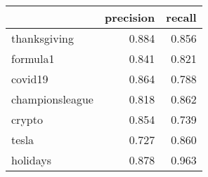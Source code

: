 \begin{tabular}{lrr}
\toprule
{} &  precision &  recall \\
\midrule
thanksgiving    &      0.884 &   0.856 \\
formula1        &      0.841 &   0.821 \\
covid19         &      0.864 &   0.788 \\
championsleague &      0.818 &   0.862 \\
crypto          &      0.854 &   0.739 \\
tesla           &      0.727 &   0.860 \\
holidays        &      0.878 &   0.963 \\
\bottomrule
\end{tabular}

